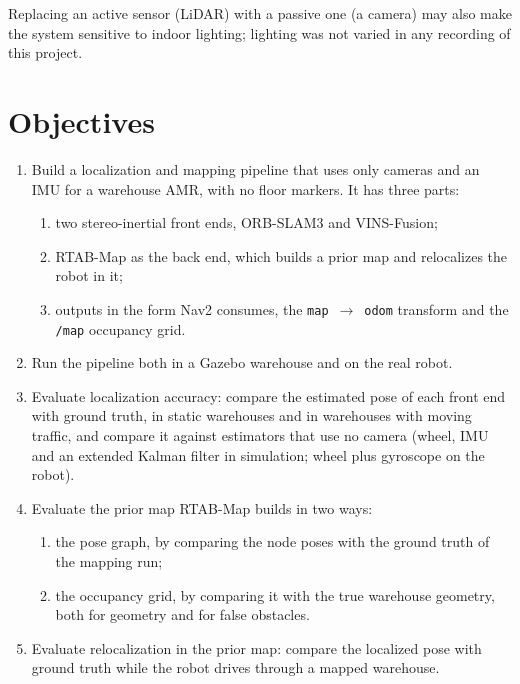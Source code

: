 Replacing an active sensor (LiDAR) with a passive one (a camera) may also make
the system sensitive to indoor lighting; lighting was not varied in any
recording of this project.

\section{Objectives}
\label{sec:objectives}

\begin{enumerate}[leftmargin=2em]
  \item Build a localization and mapping pipeline that uses only cameras and an
    IMU for a warehouse AMR, with no floor markers. It has three parts:
    \begin{enumerate}[label=(\alph*)]
      \item two stereo-inertial front ends, ORB-SLAM3 and VINS-Fusion;
      \item RTAB-Map as the back end, which builds a prior map and relocalizes
        the robot in it;
      \item outputs in the form Nav2 consumes, the
        \texttt{map}~$\rightarrow$~\texttt{odom} transform and the
        \texttt{/map} occupancy grid.
    \end{enumerate}
  \item Run the pipeline both in a Gazebo warehouse and on the real robot.
  \item Evaluate localization accuracy: compare the estimated pose of each front
    end with ground truth, in static warehouses and in warehouses with moving
    traffic, and compare it against estimators that use no camera (wheel, IMU
    and an extended Kalman filter in simulation; wheel plus gyroscope on the
    robot).
  \item Evaluate the prior map RTAB-Map builds in two ways:
    \begin{enumerate}[label=(\alph*)]
      \item the pose graph, by comparing the node poses with the ground truth of
        the mapping run;
      \item the occupancy grid, by comparing it with the true warehouse geometry,
        both for geometry and for false obstacles.
    \end{enumerate}
  \item Evaluate relocalization in the prior map: compare the localized pose
    with ground truth while the robot drives through a mapped warehouse.
\end{enumerate}

